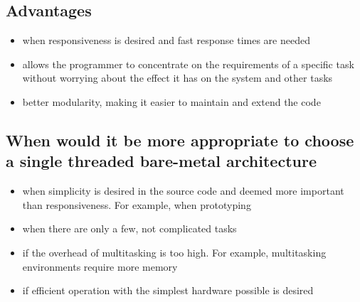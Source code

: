 \subsection*{Advantages}
\begin{itemize}
  \item when responsiveness is desired and fast response times are needed
  \item allows the programmer to concentrate on the requirements of a
    specific task without worrying about the effect it has on the system and
    other tasks
  \item better modularity, making it easier to maintain and extend the code
\end{itemize}

\subsection*{When would it be more appropriate to choose a single threaded
  bare-metal architecture}

\begin{itemize}
  \item when simplicity is desired in the source code and deemed more important
    than responsiveness. For example, when prototyping
  \item when there are only a few, not complicated tasks
  \item if the overhead of multitasking is too high. For example, multitasking
    environments require more memory
  \item if efficient operation with the simplest hardware possible is desired
\end{itemize}
